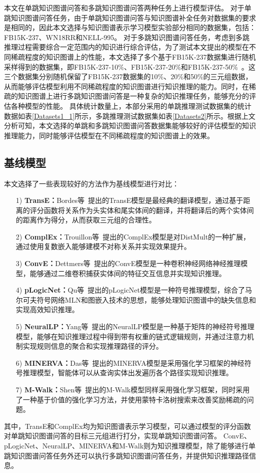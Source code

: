 \documentclass[algorithmlist, AutoFakeBold, AutoFakeSlant, figurelist, tablelist, nomlist, engineering]{seuthesix}
\begin{document}
本文在单跳知识图谱问答和多跳知识图谱问答两种任务上进行模型评估。
对于单跳知识图谱问答任务，由于单跳知识图谱问答与知识图谱补全任务对数据集的要求是相同的，因此本文选择与知识图谱表示学习模型实验部分相同的数据集，包括：FB15K-237、WN18RR和NELL-995。
对于多跳知识图谱问答任务，考虑到多跳推理过程需要综合一定范围内的知识进行综合评估，为了测试本文提出的模型在不同稀疏程度的知识图谱上的性能，本文选择了多个基于FB15K-237数据集进行随机采样得到的数据集，即FB15K-237-10\%、FB15K-237-20\%和FB15K-237-50\%~\cite{lv2020dynamic}。这三个数据集分别随机保留了FB15K-237数据集的10\%、20\%和50\%的三元组数据，从而能够评估模型利用不同稀疏程度的知识图谱进行知识推理的能力。同时，在稀疏的知识图谱上进行多跳知识图谱问答是一种复杂的知识推理任务，能够充分的评估各种模型的性能。
具体统计数量上，本部分采用的单跳推理测试数据集的统计数据如表\ref{Datasets1_1}所示，多跳推理测试数据集如表\ref{Datasets2}所示。根据上文分析可知，本文选择的单跳和多跳知识图谱问答数据集能够较好的评估模型的知识推理能力，同时能够评估模型在不同稀疏程度的知识图谱上的效果。

\subsection{基线模型}
本文选择了一些表现较好的方法作为基线模型进行对比：
\begin{itemize}
  \item [1)]\textbf{TransE：}Bordes等~\cite{bordes2013translating}提出的TransE模型是最经典的翻译模型，通过基于距离的评分函数将关系作为头实体和尾实体间的翻译，并将翻译后的两个实体间的距离作为得分，从而获取三元组的合理性。
  \item [2)]\textbf{ComplEx：}Trouillon等~\cite{trouillon2016complex}提出的ComplEx模型是对DistMult的一种扩展，通过使用复数嵌入能够建模不对称关系并实现效果提升。
  \item [3)]\textbf{ConvE：}Dettmers等~\cite{dettmers2018convolutional}提出的ConvE模型是一种卷积神经网络神经推理模型，能够通过二维卷积捕获实体间的特征交互信息并实现知识推理。
  \item [4)]\textbf{pLogicNet：}Qu等~\cite{qu2019probabilistic}提出的pLogicNet模型是一种符号推理模型，综合了马尔可夫符号网络MLN和图嵌入技术的思想，能够处理知识图谱中的缺失信息和实现高效知识推理。
  \item [5)]\textbf{NeuralLP：}Yang等~\cite{yang2017differentiable}提出的NeuralLP模型是一种基于矩阵的神经符号推理模型，能够在知识推理过程中得到带有权重的链式逻辑规则，并通过注意力机制实现规则信息的聚合和实现推理路径的评分。
  \item [6)]\textbf{MINERVA：}Das等~\cite{das2018go}提出的MINERVA模型是采用强化学习框架的神经符号推理模型，智能体可以从查询实体出发遍历各个路径实现知识推理。
  \item [7)]\textbf{M-Walk：}Shen等~\cite{shen2018m}提出的M-Walk模型同样采用强化学习框架，同时采用了一种基于价值的强化学习方法，并使用蒙特卡洛树搜索来改善奖励稀疏的问题。
\end{itemize}
其中，TransE和ComplEx均为知识图谱表示学习模型，可以通过模型的评分函数对单跳知识图谱问答的目标三元组进行打分，实现单跳知识图谱问答。
ConvE、pLogicNet、NeuralLP、MINERVA和M-Walk则为知识推理模型，除了能够进行单跳知识图谱问答任务外还可以执行多跳知识图谱问答任务，并提供知识推理路径信息。
\end{document}
